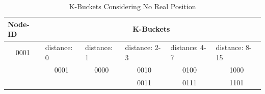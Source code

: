 \documentclass[12pt,oneside,a4paper]{article}
\begin{document}
\begin{table}[!h
]
\centering
\caption{K-Buckets Considering No Real Position}
\label{my-label}
\begin{tabular}{|c|c|c|c|c|c|}
\hline
\multicolumn{1}{|l|}{Node-ID} & \multicolumn{5}{c|}{K-Buckets}                                                                                                                                                      \\ \hline
0001                          & \multicolumn{1}{l|}{distance: 0} & \multicolumn{1}{l|}{distance: 1} & \multicolumn{1}{l|}{distance: 2-3} & \multicolumn{1}{l|}{distance: 4-7} & \multicolumn{1}{l|}{distance: 8-15} \\ \hline
                              & 0001                             & 0000                             & 0010                               & 0100                               & 1000                                \\ \hline
                              &                                  &                                  & 0011                               & 0111                               & 1101                                \\ \hline
\end{tabular}
\end{table}
\end{document}
